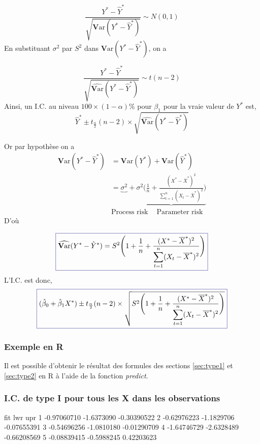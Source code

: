 \documentclass[11pt,french]{report}
\newcommand{\Var}{\mathrm{\textbf{V}ar}}
\begin{document}
$$
\frac{Y^* - \hat{Y}^*}{\sqrt{\Var(Y^* - \hat{Y}^*)}} \sim N(0,1)
$$
En substituant $\sigma^2$ par $S^2$ dans $\Var(Y^* - \hat{Y}^*)$, on a

$$
\frac{Y^* - \hat{Y}^*}{\sqrt{\widehat{\Var}(Y^* - \hat{Y}^*)}} \sim t(n-2)
$$
Ainsi, un I.C. au niveau $100 \times (1 - \alpha)\%$ pour $\beta_1$  pour la vraie valeur de $Y^*$ est,
$$
\hat{Y}^* \pm t_{\frac{\alpha}{2}}(n-2)\times \sqrt{\widehat{\Var}(Y^* - \hat{Y}^*)}
$$

Or par hypothèse on a
\begin{align*}
\Var(Y^* - \hat{Y}^*) &= \Var(Y^*) + \Var(\hat{Y}^*) \\
&= \underbrace{\sigma^2} +\underbrace{\sigma^2\Bigg( \frac{1}{n} + \frac{(X^* - \overline{X}^*)^2}{\displaystyle\sum_{t=1}^n (X_t - \overline{X}^*)^2}\Bigg)}  \\
&   \text{Process risk }\ \ \ \  \text{Parameter risk}
\end{align*}
D'où 

\begin{equation}
\label{eq:var2*}
\color{Blue}
\boxed{\color{black}
\widehat{\Var}(Y^* - \hat{Y}^*) = S^2 \Bigg(1 + \frac{1}{n} + \frac{(X^* - \overline{X}^*)^2}{\displaystyle\sum_{t=1}^n (X_t - \overline{X}^*)^2}\Bigg)  
}
\end{equation}
L'I.C. est donc,
\begin{equation}
\label{eq:IC3}
\color{Blue}
\boxed{\color{black}
(\hat{\beta}_0 + \hat{\beta}_1X^*) \pm t_{\frac{\alpha}{2}}(n-2)\times \sqrt{S^2 \Bigg(1 + \frac{1}{n} + \frac{(X^* - \overline{X}^*)^2}{\displaystyle\sum_{t=1}^n (X_t - \overline{X}^*)^2}\Bigg)}  
}
\end{equation}

\subsubsection*{Exemple en R}
Il est possible d'obtenir le résultat des formules des sections \ref{sec:type1} et \ref{sec:type2} en R à l'aide de la fonction \emph{predict}.

\subsubsection*{I.C. de type I pour tous les X dans les observations}
\begin{Schunk}
\begin{Soutput}
          fit        lwr         upr
1 -0.97060710 -1.6373090 -0.30390522
2 -0.62976223 -1.1829706 -0.07655391
3 -0.54696256 -1.0810180 -0.01290709
4 -1.64746729 -2.6328489 -0.66208569
5 -0.08839415 -0.5988245  0.42203623
\end{Soutput}
\end{Schunk}
\end{document}
